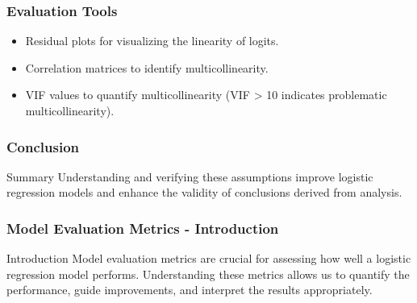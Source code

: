 \documentclass[aspectratio=169]{beamer}
\begin{document}
\begin{frame}[fragile]
    \frametitle{Evaluation Tools}
    \begin{itemize}
        \item Residual plots for visualizing the linearity of logits.
        \item Correlation matrices to identify multicollinearity.
        \item VIF values to quantify multicollinearity (VIF > 10 indicates problematic multicollinearity).
    \end{itemize}
\end{frame}

\begin{frame}[fragile]
    \frametitle{Conclusion}
    \begin{block}{Summary}
        Understanding and verifying these assumptions improve logistic regression models and enhance the validity of conclusions derived from analysis.
    \end{block}
\end{frame}

\begin{frame}[fragile]
    \frametitle{Model Evaluation Metrics - Introduction}
    \begin{block}{Introduction}
        Model evaluation metrics are crucial for assessing how well a logistic regression model performs. 
        Understanding these metrics allows us to quantify the performance, guide improvements, and interpret the results appropriately.
    \end{block}
\end{frame}
\end{document}
